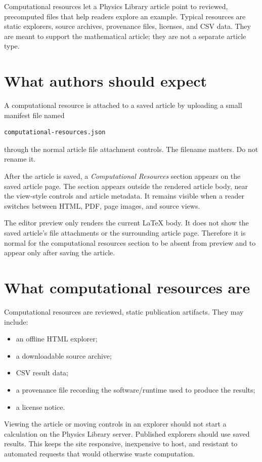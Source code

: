 Computational resources let a Physics Library article point to reviewed,
precomputed files that help readers explore an example.  Typical resources are
static explorers, source archives, provenance files, licenses, and CSV data.
They are meant to support the mathematical article; they are not a separate
article type.

\section{What authors should expect}

A computational resource is attached to a saved article by uploading a small
manifest file named
\begin{verbatim}
computational-resources.json
\end{verbatim}
through the normal article file attachment controls.  The filename matters.
Do not rename it.

After the article is saved, a \emph{Computational Resources} section appears on
the saved article page.  The section appears outside the rendered article body,
near the view-style controls and article metadata.  It remains visible when a
reader switches between HTML, PDF, page images, and source views.

The editor preview only renders the current LaTeX body.  It does not show the
saved article's file attachments or the surrounding article page.  Therefore it
is normal for the computational resources section to be absent from preview and
to appear only after saving the article.

\section{What computational resources are}

Computational resources are reviewed, static publication artifacts.  They may
include:
\begin{itemize}
\item an offline HTML explorer;
\item a downloadable source archive;
\item CSV result data;
\item a provenance file recording the software/runtime used to produce the
      results;
\item a license notice.
\end{itemize}

Viewing the article or moving controls in an explorer should not start a
calculation on the Physics Library server.  Published explorers should use saved
results.  This keeps the site responsive, inexpensive to host, and resistant to
automated requests that would otherwise waste computation.

